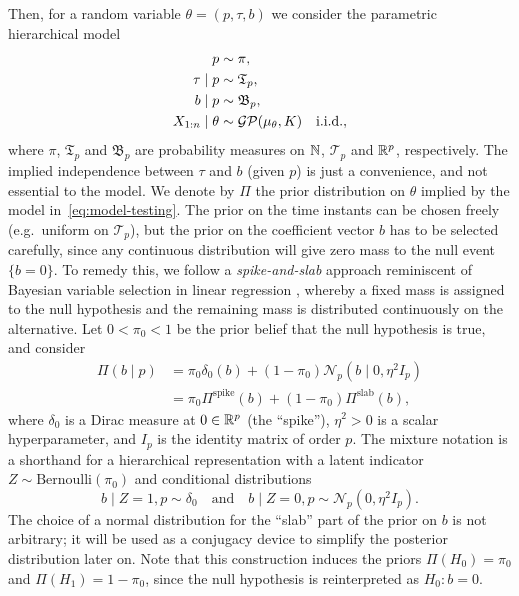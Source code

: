 Then, for a random variable \(\theta=(p,\tau,b)\) we consider the parametric hierarchical model
\begin{equation}\label{eq:model-testing}
  \begin{split}
  p &\sim \pi,\\
  \tau\mid p &\sim \mathfrak{T}_p,\\
  b\mid p &\sim \mathfrak{B}_p,\\
  X_{1:n} \mid \theta &\sim \operatorname{\mathcal{GP}}(\mu_\theta, K) \quad \text{i.i.d.},
  \end{split}
\end{equation}
where \(\pi\), \(\mathfrak{T}_p\) and \(\mathfrak{B}_p\) are probability measures on \(\mathbb{N}\), \(\mathcal T_p\) and \(\mathbb{R}^p\), respectively. The implied independence between \(\tau\) and \(b\) (given \(p\)) is just a convenience, and not essential to the model. We denote by \(\Pi\) the prior distribution on \(\theta\) implied by the model in~\eqref{eq:model-testing}. The prior on the time instants can be chosen freely (e.g.\ uniform on \(\mathcal T_p\)), but the prior on the coefficient vector \(b\) has to be selected carefully, since any continuous distribution will give zero mass to the null event \(\{b=0\}\). To remedy this, we follow a \textit{spike-and-slab} approach reminiscent of Bayesian variable selection in linear regression \citep[e.g.][]{mitchell1988bayesian,ishwaran2005spike}, whereby a fixed mass is assigned to the null hypothesis and the remaining mass is distributed continuously on the alternative. Let \(0<\pi_0<1\) be the prior belief that the null hypothesis is true, and consider
\begin{equation}\label{eq:prior-b}
  \begin{split}
\Pi(b\mid p) &= \pi_0 \delta_0(b) + (1-\pi_0)\mathcal N_p(b\mid 0, \eta^2 I_p)\\
  &= \pi_0\Pi^{\text{spike}}(b) + (1-\pi_0)\Pi^{\text{slab}}(b),
  \end{split}
\end{equation}
where \(\delta_0\) is a Dirac measure at \(0\in \mathbb{R}^p\) (the ``spike''), \(\eta^2>0\) is a scalar hyperparameter, and \(I_p\) is the identity matrix of order \(p\). The mixture notation is a shorthand for a hierarchical representation with a latent indicator \(Z\sim \text{Bernoulli}(\pi_0)\) and conditional distributions 
\[
  b\mid Z=1, p \sim \delta_0\quad \text{and}\quad b\mid Z=0, p \sim \mathcal N_p(0, \eta^2 I_p).
\]
The choice of a normal distribution for the ``slab'' part of the prior on \(b\) is not arbitrary; it will be used as a conjugacy device to simplify the posterior distribution later on. Note that this construction induces the priors \(\Pi(H_0)=\pi_0\) and \(\Pi(H_1)=1-\pi_0\), since the null hypothesis is reinterpreted as \(H_0: b=0\).

